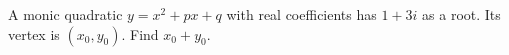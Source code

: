 A monic quadratic $y=x^2+px+q$ with real coefficients has $1+3i$ as a root. Its vertex is $(x_0,y_0)$. Find $x_0+y_0$.
